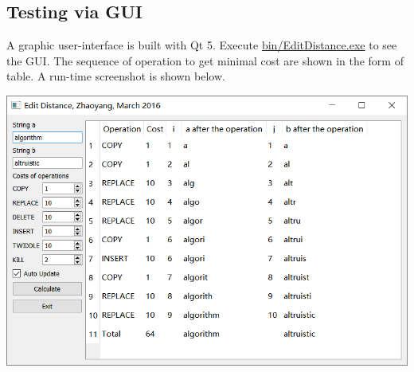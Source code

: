 \begin{homeworkProblem}
{\subsection{Testing via GUI}
A graphic user-interface is built with Qt 5. Execute \url{bin/EditDistance.exe} to see the GUI. The sequence of operation to get minimal cost are shown in the form of table. A run-time screenshot is shown below.

\includegraphics[width=0.75\columnwidth]{screenshot}
}

\end{homeworkProblem}





